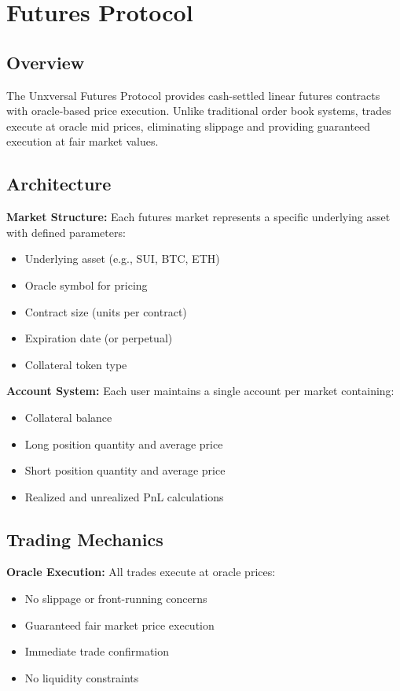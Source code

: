 \documentclass[12pt]{article}
\begin{document}
\section{Futures Protocol}

\subsection{Overview}

The Unxversal Futures Protocol provides cash-settled linear futures contracts with oracle-based price execution. Unlike traditional order book systems, trades execute at oracle mid prices, eliminating slippage and providing guaranteed execution at fair market values.

\subsection{Architecture}

\textbf{Market Structure:} Each futures market represents a specific underlying asset with defined parameters:
\begin{itemize}
    \item Underlying asset (e.g., SUI, BTC, ETH)
    \item Oracle symbol for pricing
    \item Contract size (units per contract)
    \item Expiration date (or perpetual)
    \item Collateral token type
\end{itemize}

\textbf{Account System:} Each user maintains a single account per market containing:
\begin{itemize}
    \item Collateral balance
    \item Long position quantity and average price
    \item Short position quantity and average price
    \item Realized and unrealized PnL calculations
\end{itemize}

\subsection{Trading Mechanics}

\textbf{Oracle Execution:} All trades execute at oracle prices:
\begin{itemize}
    \item No slippage or front-running concerns
    \item Guaranteed fair market price execution
    \item Immediate trade confirmation
    \item No liquidity constraints
\end{itemize}
\end{document}
